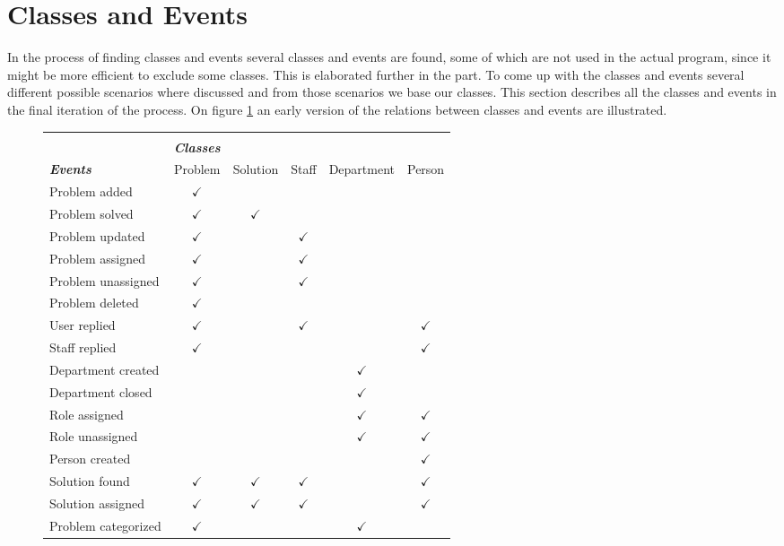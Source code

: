 \section{Classes and Events}
\label{cap:classesevents}
In the process of finding classes and events several classes and events are found, some of which are not used in the actual program, since it might be more efficient to exclude some classes. 
This is elaborated further in the  part. 
To come up with the classes and events several different possible scenarios where discussed and from those scenarios we base our classes. 
This section describes all the classes and events in the final iteration of the process. 
On figure \ref{fig:classeseventstable} an early version of the relations between classes and events are illustrated.


\begin{figure}[]
\begin{tabular}{ l c c c c c} \hline
\\
&\emph{\textbf{Classes}} &  &  & &  \\ 
\emph{\textbf{Events}} 		& Problem 		& Solution 			& Staff 			& Department & Person \\ \hline
 Problem added 			& $ \checkmark $ 	&  				&  				& &  \\ 
 Problem solved 			& $ \checkmark $ 	& $ \checkmark $ 	& 				& &  \\ 
 Problem updated 			& $ \checkmark $ 	&  				& $ \checkmark $ 	&  &  \\ 
 Problem assigned 			& $ \checkmark $ 	&  				& $ \checkmark $ 	&  &  \\ 
 Problem unassigned 		& $ \checkmark $ 	&  				& $ \checkmark $ 	&  &  \\ 
 Problem deleted 			& $ \checkmark $ 	&  				&  				&  &  \\ 
 User replied 				& $ \checkmark $ 	&  				& $ \checkmark $ 	&  & $ \checkmark $  \\ 
 Staff replied 				& $ \checkmark $ 	&  				&  				&  &  $ \checkmark $ \\ 
 Department created 			&  				&  				&  				& $ \checkmark $ &  \\ 
 Department closed 			&  				&  				&  				& $ \checkmark $ &  \\ 
 Role assigned 				&  				&  				&  				& $ \checkmark $ & $ \checkmark $  \\ 
 Role unassigned 			&  				&  				&  				&  $ \checkmark $  & $ \checkmark $ \\ 
 Person created 			&  				&  				&  				&  & $ \checkmark $ \\ 
 Solution found 				& $ \checkmark $ 	& $ \checkmark $ 	& $ \checkmark $ 	&  & $ \checkmark $ \\ 
 Solution assigned			& $ \checkmark $ 	& $ \checkmark $ 	& $ \checkmark $ 	&  & $ \checkmark $ \\ 
 Problem categorized			& $ \checkmark $ 	&  				&  				& $ \checkmark $ &  \\ \hline
\end{tabular}
\label{fig:classeseventstable}
\end{figure}

